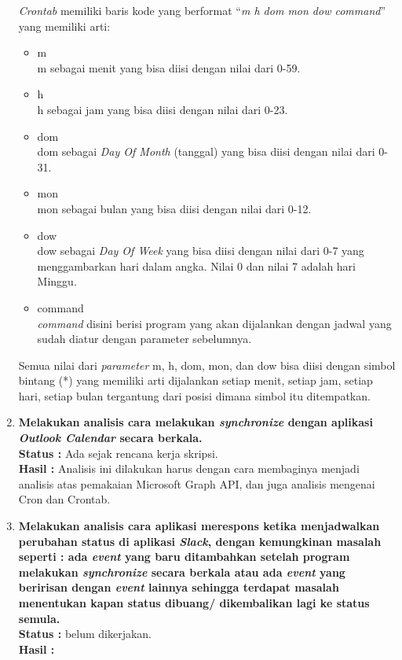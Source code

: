 \documentclass[a4paper,twoside]{article}
\begin{document}
\begin{enumerate}
\textit{Crontab} memiliki baris kode yang berformat ``\textit{m h dom mon dow command}'' yang memiliki arti:
\begin{itemize}
	\item m\\
	m sebagai menit yang bisa diisi dengan nilai dari 0-59. 
	\item h\\
	h sebagai jam yang bisa diisi dengan nilai dari 0-23.
	\item dom\\
	dom sebagai \textit{Day Of Month} (tanggal) yang bisa diisi dengan nilai dari 0-31.
	\item mon\\
	mon sebagai bulan yang bisa diisi dengan nilai dari 0-12.
	\item dow\\
	dow sebagai \textit{Day Of Week} yang bisa diisi dengan nilai dari 0-7 yang menggambarkan hari dalam angka. Nilai 0 dan nilai 7 adalah hari Minggu. 
	\item command\\
	\textit{command} disini berisi program yang akan dijalankan dengan jadwal yang sudah diatur dengan parameter sebelumnya. 
\end{itemize}

Semua nilai dari \textit{parameter} m, h, dom, mon, dan dow bisa diisi dengan simbol bintang (*) yang memiliki arti dijalankan setiap menit, setiap jam, setiap hari, setiap bulan tergantung dari posisi dimana simbol itu ditempatkan. 

		\item \textbf{Melakukan analisis cara melakukan \textit{synchronize} dengan aplikasi \textit{Outlook Calendar} secara berkala.}\\
		{\bf Status :} Ada sejak rencana kerja skripsi.\\
		{\bf Hasil :} Analisis ini dilakukan harus dengan cara membaginya menjadi analisis atas pemakaian Microsoft Graph API, dan juga analisis mengenai Cron dan Crontab.  

		\item \textbf{Melakukan analisis cara aplikasi merespons ketika menjadwalkan perubahan status di aplikasi \textit{Slack}, dengan kemungkinan masalah seperti : ada \textit{event} yang baru ditambahkan setelah program melakukan \textit{synchronize} secara berkala atau ada \textit{event} yang beririsan dengan \textit{event} lainnya sehingga terdapat masalah menentukan kapan status dibuang/ dikembalikan lagi ke status semula.}\\
		{\bf Status :} belum dikerjakan.\\
		{\bf Hasil :}


\end{enumerate}
\end{document}
